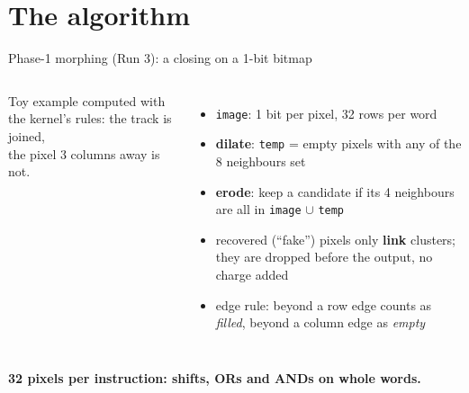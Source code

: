 \documentclass[aspectratio=169,10pt,xcolor=table]{beamer}
\newcommand{\takeaway}[1]{\begin{center}\color{cmsblue}\textbf{#1}\end{center}}
\newcommand{\code}[1]{\texttt{\small #1}}
\begin{document}
\section{The algorithm}
\begin{frame}{Phase-1 morphing (Run 3): a closing on a 1-bit bitmap}
  \begin{columns}[T]
    \centering

    \vspace{4pt}
    \parbox{0.95\linewidth}{\centering\scriptsize Toy example computed with the kernel's rules: the track is joined,\\ the pixel 3 columns away is not.}
    \begin{itemize}
      \item \code{image}: 1 bit per pixel, 32 rows per word
      \item \textbf{dilate}: \code{temp} = empty pixels with any of the 8 neighbours set
      \item \textbf{erode}: keep a candidate if its 4 neighbours are all in \code{image} $\cup$ \code{temp}
      \item recovered (``fake'') pixels only \textbf{link} clusters; they are dropped before the output, no charge added
      \item edge rule: beyond a row edge counts as \emph{filled}, beyond a column edge as \emph{empty}
    \end{itemize}
  \end{columns}
  \takeaway{32 pixels per instruction: shifts, ORs and ANDs on whole words.}
\end{frame}
\end{document}
